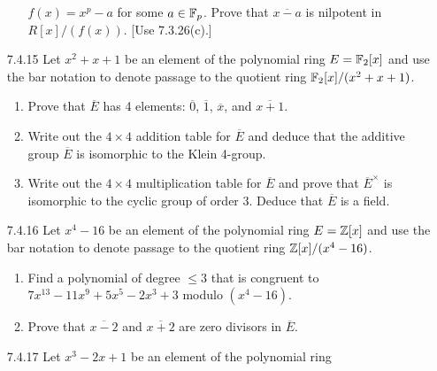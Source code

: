 \begin{enumerate}
\begin{enumerate}
                           $f(x) = x^p - a$ for some $a \in \mathbb{F}_p$. Prove that
                           $\overline{x-a}$ is nilpotent in $R[x]/(f(x))$. [Use
                           7.3.26(c).]
                  \end{enumerate}
   \item[7.4.15]  Let $x^2 + x + 1$ be an element of the polynomial ring
                  $E = \mathbb{F}_2[x]$ and use the bar notation to denote passage to 
                  the quotient ring $\mathbb{F}_2[x]/(x^2 + x + 1)$.
                  \begin{enumerate}
                     \item Prove that $\overline{E}$ has 4 elements:
                           $\overline{0}$, $\overline{1}$, $\overline{x}$, and
                           $\overline{x+1}$.
                     \item Write out the $4 \times 4$ addition table for
                           $\overline{E}$ and deduce that the additive group
                           $\overline{E}$ is isomorphic to the Klein 4-group.
                     \item Write out the $4 \times 4$ multiplication table for
                           $\overline{E}$ and prove that $\overline{E}^\times$
                           is isomorphic to the cyclic group of order 3. Deduce
                           that $\overline{E}$ is a field.
                  \end{enumerate}
   \item[7.4.16]  Let $x^4 - 16$ be an element of the polynomial ring
                  $E = \mathbb{Z}[x]$ and use the bar notation to denote passage to the
                  quotient ring $\mathbb{Z}[x]/(x^4 - 16)$.
                  \begin{enumerate}
                     \item Find a polynomial of degree $\le 3$ that is congruent
                           to $7x^{13} - 11x^9 + 5x^5 - 2x^3 + 3$ modulo
                           $(x^4 - 16)$.
                     \item Prove that $\overline{x - 2}$ and $\overline{x + 2}$
                           are zero divisors in $\overline{E}$.
                  \end{enumerate}
   \item[7.4.17]  Let $x^3 - 2x + 1$ be an element of the polynomial ring

\end{enumerate}
